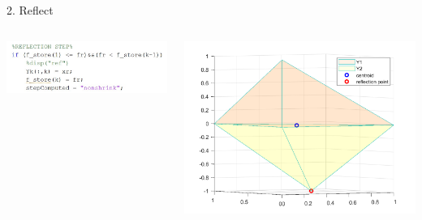 \documentclass{beamer}
\begin{document}
\begin{frame}{2. Reflect}
	\begin{columns}
	\begin{column}{0.39\linewidth}
		\centering
		\includegraphics[width=0.95\linewidth]{Reflect}
	\end{column}
	\begin{column}{0.59\linewidth}
		\centering
		\includegraphics[width=0.95\linewidth]{ReflectFig}
	\end{column}
	\end{columns}
\end{frame}
\end{document}

